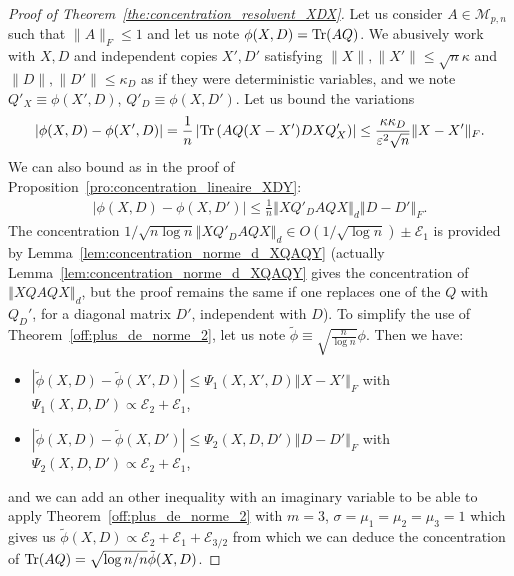 \documentclass[a4papaer, titlepage]{book}
\begin{document}
\begin{proof}[Proof of Theorem~\ref{the:concentration_resolvent_XDX}]
  Let us consider $A\in \mathcal{M}_{p,n}$ such that $\|A\|_F\leq 1$ and let us note $\phi(X,D)  = \operatorname{Tr}(A Q)$. We abusively work with $X,D$ and independent copies $X',D'$  satisfying $\|X\|,\|X'\| \leq \sqrt n \kappa$ and $\|D\|,\|D'\| \leq \kappa_D$ as if they were deterministic variables, and we note $Q'_X \equiv \phi(X',D)$, $Q'_D \equiv \phi(X,D')$. Let us bound the variations
  \begin{align*}
    \left\vert \phi(X,D) - \phi(X',D)\right\vert = \frac{1}{n} \left\vert \operatorname{Tr} \left(AQ (X-X') DX Q'_X\right)\right\vert \leq \frac{\kappa\kappa_D}{\varepsilon^2\sqrt n} \|X-X'\|_F.
  \end{align*}
  We can also bound as in the proof of Proposition~\ref{pro:concentration_lineaire_XDY}:
  \begin{align*}
    \left\vert \phi(X,D) - \phi(X,D')\right\vert \leq \frac{1}{n} \left\Vert X Q'_D AQX\right\Vert_d \left\Vert D-D'\right\Vert_F.
  \end{align*}
  The concentration $1/\sqrt{n\log n}\left\Vert X Q'_D AQX\right\Vert_d \in O(1/\sqrt {\log n}) \pm \mathcal E_1$ is provided by Lemma~\ref{lem:concentration_norme_d_XQAQY} (actually Lemma~\ref{lem:concentration_norme_d_XQAQY} gives the concentration of $\left\Vert X Q AQX\right\Vert_d$, but the proof remains the same if one replaces one of the $Q$ with $Q_D'$, for a diagonal matrix $D'$, independent with $D$).
  To simplify the use of Theorem~\ref{off:plus_de_norme_2}, let us note $\tilde \phi \equiv \sqrt{\frac{ n}{\log n}} \phi$. Then we have:
  \begin{itemize}
    \item $\left\vert \tilde \phi(X,D) - \tilde \phi(X',D)\right\vert \leq \Psi_1(X,X',D) \left\Vert X-X'\right\Vert_F$ with $\Psi_1(X,D,D') \propto \mathcal E_2 + \mathcal E_1$,
    \item $\left\vert \tilde \phi(X,D) - \tilde \phi(X,D')\right\vert \leq \Psi_2(X,D,D') \left\Vert D-D'\right\Vert_F$ with $\Psi_2(X,D,D') \propto \mathcal E_2 + \mathcal E_1$,
  \end{itemize}
  and we can add an other inequality with an imaginary variable to be able to apply Theorem~\ref{off:plus_de_norme_2} with $m=3$, $\sigma = \mu_1 = \mu_2 = \mu_3 = 1$ which gives us $\tilde \phi(X,D) \propto \mathcal E_2 + \mathcal E_1 + \mathcal E_{3/2}$ from which we can deduce the concentration of $\operatorname{Tr}(AQ) = \sqrt{\log n/n} \tilde \phi(X,D)$.
\end{proof}
\end{document}
